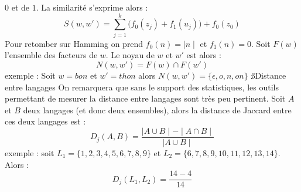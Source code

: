 \documentclass[a4paper,11pt]{article}
\begin{document}
  $0$ et de $1$. La similarité s'exprime alors :
  \[
  S(w, w') = \sum^k_{j = 1}\bigg(f_0(z_j) + f_1(u_j)\bigg) + f_0(z_0)
  \]
  \p Pour retomber sur Hamming on prend $f_0(n) = \mid{}n\mid$ et $f_1(n) = 0$.
  Soit $F(w)$ l'ensemble des facteurs de $w$. Le noyau de $w$ et $w'$ est
  alors :
  \[
  N(w, w') = F(w) \cap F(w')
  \]
  \p exemple : Soit $w = bon$ et $w' = thon$ alors
  $N(w, w') = \{\epsilon, o, n, on\}$
 \ss{Distance entre langages}
 On remarquera que sans le support des statistiques, les outils
 permettant de mesurer la distance entre langages sont très peu
 pertinent.
  Soit $A$ et $B$ deux langages (et donc deux ensembles), alors la distance de
  Jaccard entre ces deux langages est :
  \[
  D_j(A, B) = \frac{\mid A \cup B \mid - \mid A \cap B \mid}{\mid A \cup B \mid}
  \]
  \p exemple : soit $L_1 = \{1, 2, 3, 4, 5, 6, 7, 8, 9\}$ et
  $L_2 = \{6, 7, 8, 9, 10, 11, 12, 13, 14\}$. Alors :
  \[
  D_j(L_1, L_2) = \frac{14 - 4}{14}
  \]
\end{document}
